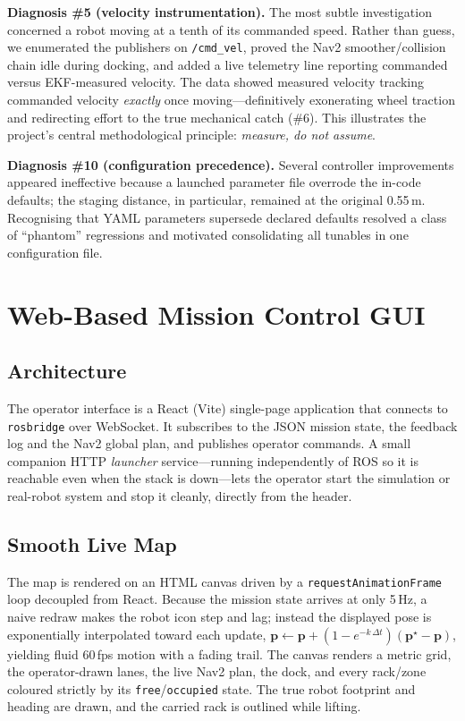 \documentclass[11pt,a4paper]{article}
\newcommand{\code}[1]{\texttt{\small #1}}
\begin{document}
\textbf{Diagnosis \#5 (velocity instrumentation).} The most subtle
investigation concerned a robot moving at a tenth of its commanded speed.
Rather than guess, we enumerated the publishers on \code{/cmd\_vel}, proved
the Nav2 smoother/collision chain idle during docking, and added a live
telemetry line reporting commanded versus EKF-measured velocity. The data
showed measured velocity tracking commanded velocity \emph{exactly} once
moving---definitively exonerating wheel traction and redirecting effort to
the true mechanical catch (\#6). This illustrates the project's central
methodological principle: \emph{measure, do not assume}.

\textbf{Diagnosis \#10 (configuration precedence).} Several controller
improvements appeared ineffective because a launched parameter file
overrode the in-code defaults; the staging distance, in particular, remained
at the original 0.55\,m. Recognising that YAML parameters supersede declared
defaults resolved a class of ``phantom'' regressions and motivated
consolidating all tunables in one configuration file.

\section{Web-Based Mission Control GUI}\label{sec:gui}
\subsection{Architecture}
The operator interface is a React (Vite) single-page application that
connects to \code{rosbridge} over WebSocket. It subscribes to the JSON
mission state, the feedback log and the Nav2 global plan, and publishes
operator commands. A small companion HTTP \emph{launcher} service---running
independently of ROS so it is reachable even when the stack is down---lets
the operator start the simulation or real-robot system and stop it cleanly,
directly from the header.

\subsection{Smooth Live Map}
The map is rendered on an HTML canvas driven by a \code{requestAnimationFrame}
loop decoupled from React. Because the mission state arrives at only 5\,Hz, a
naive redraw makes the robot icon step and lag; instead the displayed pose is
exponentially interpolated toward each update,
$\mathbf p \leftarrow \mathbf p + (1-e^{-k\,\Delta t})(\mathbf p^\star-\mathbf p)$,
yielding fluid 60\,fps motion with a fading trail. The canvas renders a metric
grid, the operator-drawn lanes, the live Nav2 plan, the dock, and every
rack/zone coloured strictly by its \code{free}/\code{occupied} state. The true
robot footprint and heading are drawn, and the carried rack is outlined while
lifting.
\end{document}
